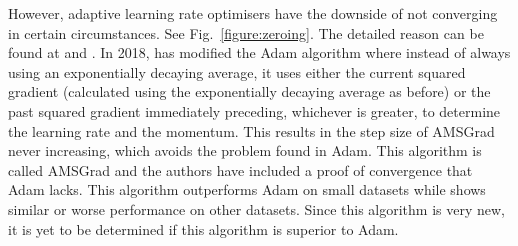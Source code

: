 \documentclass[a4paper,fleqn,usenatbib]{mnras}
\begin{document}
 However, adaptive learning rate optimisers have the downside of not converging in certain circumstances. See Fig.~\ref{figure:zeroing}. The detailed reason can be found at \citet{ObjectAMSGrad} and \citet{translateAMSGrad}. In 2018, \citet{AMSGrad} has modified the Adam algorithm where instead of always using an exponentially decaying average, it uses either the current squared gradient (calculated using the exponentially decaying average as before) or the past squared gradient immediately preceding, whichever is greater, to determine the learning rate and the momentum. This results in the step size of AMSGrad never increasing, which avoids the problem found in Adam. This algorithm is called AMSGrad and the authors have included a proof of convergence that Adam lacks. This algorithm outperforms Adam on small datasets while shows similar or worse performance on other datasets. Since this algorithm is very new, it is yet to be determined if this algorithm is superior to Adam.
 
\end{document}
